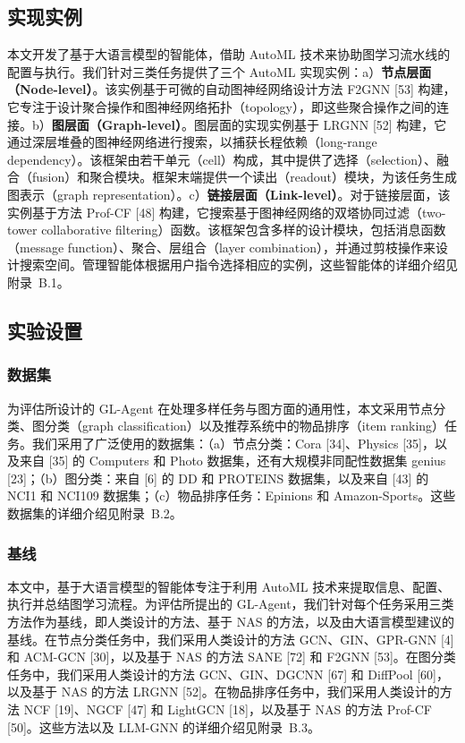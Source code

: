 \documentclass[11pt,UTF8,fontset=fandol]{ctexart}
\begin{document}
\subsection{实现实例}

本文开发了基于大语言模型的智能体，借助 AutoML 技术来协助图学习流水线的配置与执行。我们针对三类任务提供了三个 AutoML 实现实例：a）\textbf{节点层面（Node-level）}。该实例基于可微的自动图神经网络设计方法 F2GNN [53] 构建，它专注于设计聚合操作和图神经网络拓扑（topology），即这些聚合操作之间的连接。b）\textbf{图层面（Graph-level）}。图层面的实现实例基于 LRGNN [52] 构建，它通过深层堆叠的图神经网络进行搜索，以捕获长程依赖（long-range dependency）。该框架由若干单元（cell）构成，其中提供了选择（selection）、融合（fusion）和聚合模块。框架末端提供一个读出（readout）模块，为该任务生成图表示（graph representation）。c）\textbf{链接层面（Link-level）}。对于链接层面，该实例基于方法 Prof-CF [48] 构建，它搜索基于图神经网络的双塔协同过滤（two-tower collaborative filtering）函数。该框架包含多样的设计模块，包括消息函数（message function）、聚合、层组合（layer combination），并通过剪枝操作来设计搜索空间。管理智能体根据用户指令选择相应的实例，这些智能体的详细介绍见附录~B.1。

\subsection{实验设置}

\subsubsection{数据集}
为评估所设计的 GL-Agent 在处理多样任务与图方面的通用性，本文采用节点分类、图分类（graph classification）以及推荐系统中的物品排序（item ranking）任务。我们采用了广泛使用的数据集：（a）节点分类：Cora [34]、Physics [35]，以及来自 [35] 的 Computers 和 Photo 数据集，还有大规模非同配性数据集 genius [23]；（b）图分类：来自 [6] 的 DD 和 PROTEINS 数据集，以及来自 [43] 的 NCI1 和 NCI109 数据集；（c）物品排序任务：Epinions 和 Amazon-Sports。这些数据集的详细介绍见附录~B.2。

\subsubsection{基线}
本文中，基于大语言模型的智能体专注于利用 AutoML 技术来提取信息、配置、执行并总结图学习流程。为评估所提出的 GL-Agent，我们针对每个任务采用三类方法作为基线，即人类设计的方法、基于 NAS 的方法，以及由大语言模型建议的基线。在节点分类任务中，我们采用人类设计的方法 GCN、GIN、GPR-GNN [4] 和 ACM-GCN [30]，以及基于 NAS 的方法 SANE [72] 和 F2GNN [53]。在图分类任务中，我们采用人类设计的方法 GCN、GIN、DGCNN [67] 和 DiffPool [60]，以及基于 NAS 的方法 LRGNN [52]。在物品排序任务中，我们采用人类设计的方法 NCF [19]、NGCF [47] 和 LightGCN [18]，以及基于 NAS 的方法 Prof-CF [50]。这些方法以及 LLM-GNN 的详细介绍见附录~B.3。
\end{document}
